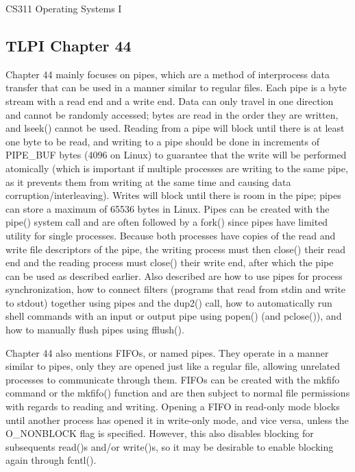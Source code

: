 \documentclass[letterpaper,10pt,fleqn]{article}
\numberwithin{equation}{section}
\begin{document}



{\Large CS311 Operating Systems I}

\subsection*{TLPI Chapter 44}

Chapter 44 mainly focuses on pipes, which are a method of interprocess data transfer that can be used in a manner similar to regular files.  Each pipe is a byte stream with a read end and a write end.  Data can only travel in one direction and cannot be randomly accessed; bytes are read in the order they are written, and lseek() cannot be used.  Reading from a pipe will block until there is at least one byte to be read, and writing to a pipe should be done in increments of PIPE\_BUF bytes (4096 on Linux) to guarantee that the write will be performed atomically (which is important if multiple processes are writing to the same pipe, as it prevents them from writing at the same time and causing data corruption/interleaving).  Writes will block until there is room in the pipe; pipes can store a maximum of 65536 bytes in Linux.  Pipes can be created with the pipe() system call and are often followed by a fork() since pipes have limited utility for single processes.  Because both processes have copies of the read and write file descriptors of the pipe, the writing process must then close() their read end and the reading process must close() their write end, after which the pipe can be used as described earlier.  Also described are how to use pipes for process synchronization, how to connect filters (programs that read from stdin and write to stdout) together using pipes and the dup2() call, how to automatically run shell commands with an input or output pipe using popen() (and pclose()), and how to manually flush pipes using fflush().

Chapter 44 also mentions FIFOs, or named pipes.  They operate in a manner similar to pipes, only they are opened just like a regular file, allowing unrelated processes to communicate through them.  FIFOs can be created with the mkfifo command or the mkfifo() function and are then subject to normal file permissions with regards to reading and writing.  Opening a FIFO in read-only mode blocks until another process has opened it in write-only mode, and vice versa, unless the O\_NONBLOCK flag is specified.  However, this also disables blocking for subsequents read()s and/or write()s, so it may be desirable to enable blocking again through fcntl().
\end{document}
